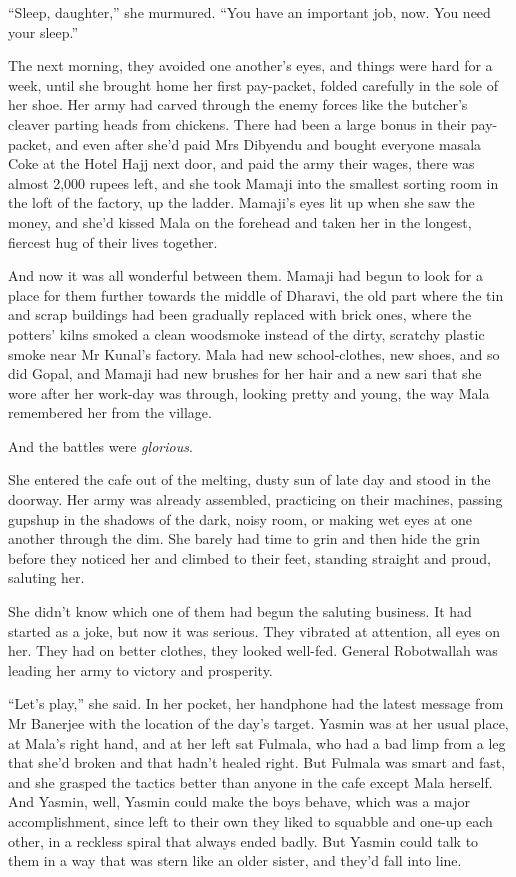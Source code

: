 ``Sleep, daughter,'' she murmured. ``You have an important job, now.
You need your sleep.''

The next morning, they avoided one another's eyes, and things were
hard for a week, until she brought home her first pay-packet,
folded carefully in the sole of her shoe. Her army had carved
through the enemy forces like the butcher's cleaver parting heads
from chickens. There had been a large bonus in their pay-packet,
and even after she'd paid Mrs Dibyendu and bought everyone masala
Coke at the Hotel Hajj next door, and paid the army their wages,
there was almost 2,000 rupees left, and she took Mamaji into the
smallest sorting room in the loft of the factory, up the ladder.
Mamaji's eyes lit up when she saw the money, and she'd kissed Mala
on the forehead and taken her in the longest, fiercest hug of their
lives together.

And now it was all wonderful between them. Mamaji had begun to look
for a place for them further towards the middle of Dharavi, the old
part where the tin and scrap buildings had been gradually replaced
with brick ones, where the potters' kilns smoked a clean woodsmoke
instead of the dirty, scratchy plastic smoke near Mr Kunal's
factory. Mala had new school-clothes, new shoes, and so did Gopal,
and Mamaji had new brushes for her hair and a new sari that she
wore after her work-day was through, looking pretty and young, the
way Mala remembered her from the village.

And the battles were \emph{glorious}.

She entered the cafe out of the melting, dusty sun of late day and
stood in the doorway. Her army was already assembled, practicing on
their machines, passing gupshup in the shadows of the dark, noisy
room, or making wet eyes at one another through the dim. She barely
had time to grin and then hide the grin before they noticed her and
climbed to their feet, standing straight and proud, saluting her.

She didn't know which one of them had begun the saluting business.
It had started as a joke, but now it was serious. They vibrated at
attention, all eyes on her. They had on better clothes, they looked
well-fed. General Robotwallah was leading her army to victory and
prosperity.

``Let's play,'' she said. In her pocket, her handphone had the latest
message from Mr Banerjee with the location of the day's target.
Yasmin was at her usual place, at Mala's right hand, and at her
left sat Fulmala, who had a bad limp from a leg that she'd broken
and that hadn't healed right. But Fulmala was smart and fast, and
she grasped the tactics better than anyone in the cafe except Mala
herself. And Yasmin, well, Yasmin could make the boys behave, which
was a major accomplishment, since left to their own they liked to
squabble and one-up each other, in a reckless spiral that always
ended badly. But Yasmin could talk to them in a way that was stern
like an older sister, and they'd fall into line.

